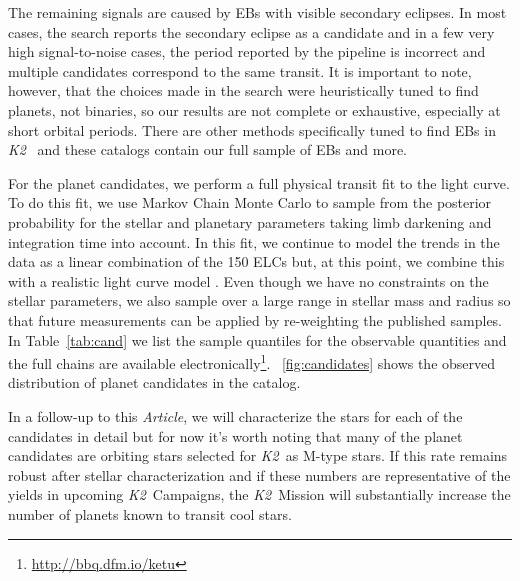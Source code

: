 \documentclass[12pt,preprint]{aastex}
\newcommand{\project}[1]{\textsl{#1}} %
\newcommand{\KT}{\project{K2}}
\newcommand{\paper}{\textsl{Article}}
\newcommand{\figref}[1]{\ref{fig:#1}}
\newcommand{\Fig}[1]{\figurename~\figref{#1}}
\newcommand{\fig}[1]{\Fig{#1}}
\newcommand{\Tab}[1]{Table~\ref{tab:#1}}
\newcommand{\tab}[1]{\Tab{#1}}
\newcommand{\datareleaseurl}{{\url{http://bbq.dfm.io/ketu}}}
\begin{document}
The remaining signals are caused by EBs with visible secondary eclipses.
In most cases, the search reports the secondary eclipse as a candidate and in
a few very high signal-to-noise cases, the period reported by the pipeline is
incorrect and multiple candidates correspond to the same transit.
It is important to note, however, that the choices made in the search were
heuristically tuned to find planets, not binaries, so our results are not
complete or exhaustive, especially at short orbital periods.
There are other methods specifically tuned to find EBs in \KT\
\citep[such as][]{Armstrong:2014, Armstrong:2015} and these catalogs contain
our full sample of EBs and more.

For the planet candidates, we perform a full physical transit fit to the light
curve.
To do this fit, we use Markov Chain Monte Carlo
\citep[MCMC;][]{Foreman-Mackey:2013} to
sample from the posterior probability for the stellar and planetary
parameters taking limb darkening and integration time into account.
In this fit, we continue to model the trends in the data as a linear
combination of the 150 ELCs but, at this point, we combine this with a
realistic light curve model \citep{Mandel:2002, Kipping:2013a}.
Even though we have no constraints on the stellar parameters, we also sample
over a large range in stellar mass and radius so that future measurements can
be applied by re-weighting the published samples.
In \tab{cand} we list the sample quantiles for the observable quantities and
the full chains are available electronically\footnote{\datareleaseurl}.
\fig{candidates} shows the observed distribution of planet candidates in the
catalog.

In a follow-up to this \paper, we will characterize the stars for each of the
candidates in detail but for now it's worth noting that many of the planet
candidates are orbiting stars selected for \KT\ as M-type stars.
If this rate remains robust after stellar characterization and if these
numbers are representative of the yields in upcoming \KT\ Campaigns, the \KT\
Mission will substantially increase the number of planets known to transit
cool stars.
\end{document}
